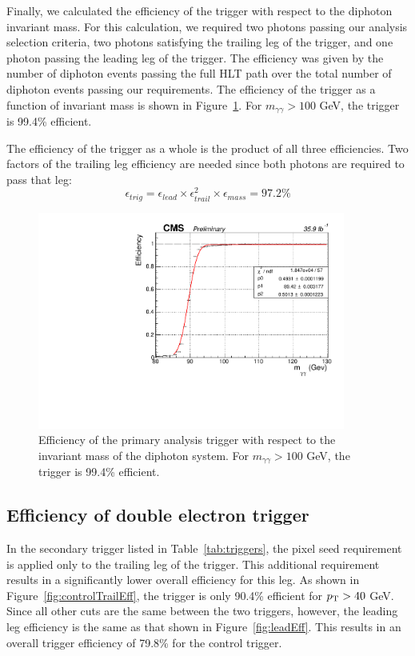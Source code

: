 Finally, we calculated the efficiency of the trigger with respect to the diphoton invariant mass. For this calculation, we required two photons passing our analysis selection criteria, two photons satisfying the trailing leg of the trigger, and one photon passing the leading leg of the trigger. The efficiency was given by the number of diphoton events passing the full HLT path over the total number of diphoton events passing our requirements. The efficiency of the trigger as a function of invariant mass is shown in Figure~\ref{fig:InvMassEff}. For $m_{\gamma\gamma} > 100$ GeV, the trigger is 99.4\% efficient.

The efficiency of the trigger as a whole is the product of all three efficiencies. Two factors of the trailing leg efficiency are needed since both photons are required to pass that leg:
\begin{equation}
 \epsilon_{trig} = \epsilon_{lead} \times \epsilon_{trail}^2 \times \epsilon_{mass} = 97.2\%
\end{equation}

\begin{figure}[h]
\begin{center}
\includegraphics[width=0.9\textwidth]{Figures/Trigger/InvMassEff.pdf}
\end{center}
\caption{Efficiency of the primary analysis trigger with respect to the invariant mass of the diphoton system. 
For $m_{\gamma\gamma} > 100$ GeV, the trigger is 99.4\% efficient.}
\label{fig:InvMassEff}
\end{figure}

\subsection{Efficiency of double electron trigger}
\label{sec:eeEff}
In the secondary trigger listed in Table~\ref{tab:triggers}, the pixel seed requirement is applied only to the trailing
leg of the trigger. This additional requirement results in a significantly lower overall efficiency for this leg. As shown in Figure~\ref{fig:controlTrailEff},
the trigger is only 90.4\% efficient for $p_{\mathrm{T}} > 40$ GeV.
Since all other cuts are the same between the two triggers, however, the leading leg efficiency is the same as that shown in Figure~\ref{fig:leadEff}.
This results in an overall trigger efficiency of 79.8\% for the control trigger.

